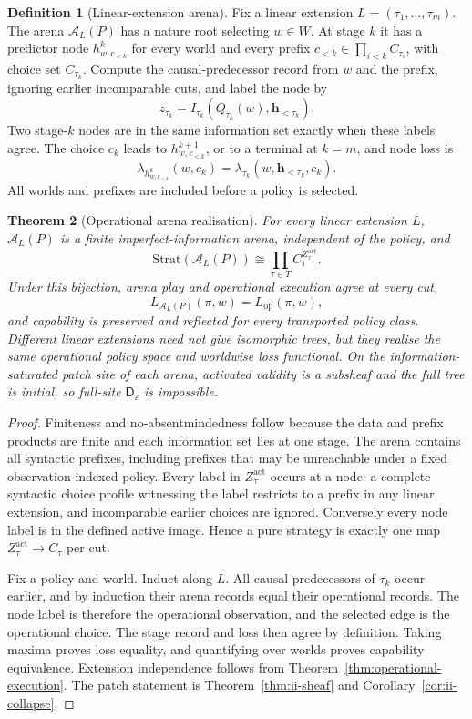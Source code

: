 \documentclass[11pt]{article}
\theoremstyle{plain}
\newtheorem{theorem}{Theorem}[section]
\theoremstyle{definition}
\newtheorem{definition}[theorem]{Definition}
\theoremstyle{remark}
\newcommand{\eps}{\varepsilon}
\begin{document}
\begin{definition}[Linear-extension arena]
\label{def:operational-arena}
Fix a linear extension $L=(\tau_1,\ldots,\tau_m)$. The arena
$\mathcal A_L(P)$ has a nature root selecting $w\in W$. At stage $k$ it has a
predictor node $h^k_{w,c_{<k}}$ for every world and every prefix
$c_{<k}\in\prod_{i<k}C_{\tau_i}$, with choice set $C_{\tau_k}$. Compute the
causal-predecessor record from $w$ and the prefix, ignoring earlier incomparable
cuts, and label the node by
\[
z_{\tau_k}=I_{\tau_k}(Q_{\tau_k}(w),\mathbf h_{<\tau_k}).
\]
Two stage-$k$ nodes are in the same information set exactly when these labels
agree. The choice $c_k$ leads to $h^{k+1}_{w,c_{\le k}}$, or to a terminal at
$k=m$, and node loss is
\[
\lambda_{h^k_{w,c_{<k}}}(w,c_k)
=\lambda_{\tau_k}(w,\mathbf h_{<\tau_k},c_k).
\]
All worlds and prefixes are included before a policy is selected.
\end{definition}

\begin{theorem}[Operational arena realisation]
\label{thm:operational-arena}
For every linear extension $L$, $\mathcal A_L(P)$ is a finite
imperfect-information arena, independent of the policy, and
\[
\mathrm{Strat}(\mathcal A_L(P))
\cong\prod_{\tau\in T}C_\tau^{Z_\tau^{\mathrm{act}}}.
\]
Under this bijection, arena play and operational execution agree at every cut,
\[
L_{\mathcal A_L(P)}(\pi,w)=L_{\mathrm{op}}(\pi,w),
\]
and capability is preserved and reflected for every transported policy class.
Different linear extensions need not give isomorphic trees, but they realise the
same operational policy space and worldwise loss functional. On the
information-saturated patch site of each arena, activated validity is a
subsheaf and the full tree is initial, so full-site
$\mathsf D_\eps$ is impossible.
\end{theorem}

\begin{proof}
Finiteness and no-absentmindedness follow because the data and prefix products
are finite and each information set lies at one stage. The arena contains all
syntactic prefixes, including prefixes that may be unreachable under a fixed
observation-indexed policy. Every label in $Z_\tau^{\mathrm{act}}$ occurs at a
node: a complete syntactic choice profile
witnessing the label restricts to a prefix in any linear extension, and
incomparable earlier choices are ignored. Conversely every node label is in the
defined active image. Hence a pure strategy is exactly one map
$Z_\tau^{\mathrm{act}}\to C_\tau$ per cut.

Fix a policy and world. Induct along $L$. All causal predecessors of
$\tau_k$ occur earlier, and by induction their arena records equal their
operational records. The node label is therefore the operational observation,
and the selected edge is the operational choice. The stage record and loss then
agree by definition. Taking maxima proves loss equality, and quantifying over
worlds proves capability equivalence. Extension independence follows from
Theorem~\ref{thm:operational-execution}. The patch statement is
Theorem~\ref{thm:ii-sheaf} and Corollary~\ref{cor:ii-collapse}.
\end{proof}
\end{document}
